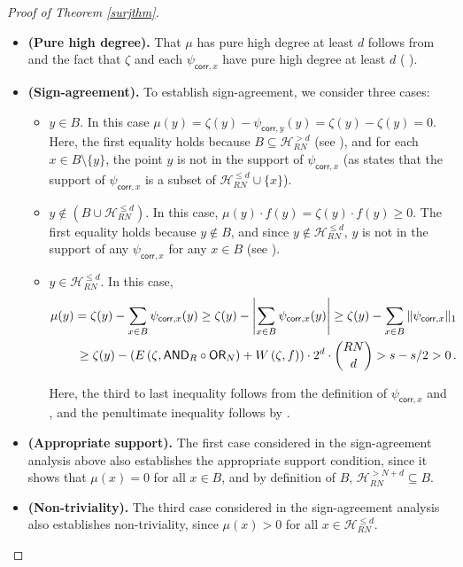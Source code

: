 \documentclass{toc}
\newcommand{\OR}{\mathsf{ OR}}
\newcommand{\AND}{\mathsf{AND}}
\begin{document}
\begin{proof}[Proof of Theorem \ref{surjthm}]
	\begin{itemize}
	\item \textbf{(Pure high degree).} That $\mu$ has pure high degree at least $d$ follows from  %
and the fact that $\zeta$ and each $\psi_{\mathsf{corr}, x}$ have pure high degree at least $d$	( ). 
		\item \textbf{(Sign-agreement).}
		To establish sign-agreement, we consider three cases:
		\begin{itemize}
			\item $y \in B$. In this case $\mu(y) = \zeta(y) - \psi_{\mathsf{corr}, y}(y) = \zeta(y) - \zeta(y) = 0$. Here,
the first equality holds because $B \subseteq \mathcal{H}_{RN}^{> d}$ 
(see ), and for each
			$x \in B \setminus \{y\}$, the point $y$ is not in the support of $\psi_{\mathsf{corr}, x}$ (as  states that the support of $\psi_{\mathsf{corr}, x}$ is a subset of $\mathcal{H}_{RN}^{\leq d} \cup \{x\}$).
			\item $y \not \in (B \cup \mathcal{H}^{\leq d}_{RN})$. In this case, $\mu(y) \cdot f(y) = \zeta(y) \cdot f(y) \geq 0$. The first equality holds 
			because $y \not \in B$, and since $y \not \in \mathcal{H}^{\leq d}_{RN}$, $y$ is not in the support of any $\psi_{\mathsf{corr}, x}$ for any $x \in B$ (see 
			). 
			\item $y \in \mathcal{H}^{\leq d}_{RN}$. In this case, \begin{align} 
			\mu(y) = \zeta(y) - \sum_{x \in B} \psi_{\mathsf{corr}, x}(y) \geq \zeta(y) - \left|\sum_{x \in B} \psi_{\mathsf{corr}, x}(y)\right|
			\geq \zeta(y) - \sum_{x \in B} \|\psi_{\mathsf{corr}, x}\|_1 \notag\\ \label{forsignrank} \geq
			\zeta(y) - \left(E\left(\zeta, \AND_R \circ \OR_N\right) +W\left(\zeta, f\right)\right) \cdot 2^d \cdot {RN \choose d} > s-s/2 >0\,.\end{align}
			
			Here, the third to last inequality follows from the definition of $\psi_{\mathsf{corr}, x}$ and , and the penultimate
			inequality follows by  .
			
		\end{itemize} 
		\item \textbf{(Appropriate support).}
		The first case considered in the sign-agreement analysis above also establishes the appropriate support condition, since it shows that $\mu(x)=0$ for all $x \in B$, and by definition of $B$, $\mathcal{H}^{> N+d}_{RN} \subseteq B$.
		\item \textbf{(Non-triviality).}
		The third case considered in the sign-agreement analysis also establishes non-triviality, since $\mu(x) > 0$ for all $x \in \mathcal{H}^{\leq d}_{RN}$. 
	\end{itemize}
	

\end{proof}
\end{document}
